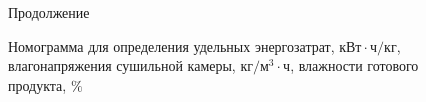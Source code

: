 \begin{figure} \ContinuedFloat
\center\addtocounter{figure}{1}
\begin{small}
\subfloat[\footnotesize 1~--~5,90; 2~--~6,59; 3~--~7,28; 4~--~7,97; 5~--~8,66;  6~--~9,34; 7~--~10,03; 8~--~10,72; 9~--~12,10]{%
\def\svgwidth{13cm}\label{f:sub5}}\quad
\end{small}
\begin{small}
\subfloat[\footnotesize 1~--~2,20; 2~--~2,43; 3~--~2,67; 4~--~2,90; 5~--~3,13;  6~--~3,37; 7~--~3,60; 8~--~3,83; 9~--~4,30]{%
\def\svgwidth{13cm}\label{f:sub6}}\quad
\end{small}
\caption{Продолжение}
\label{x1x3y1-y2}
\end{figure}



\begin{figure} 
\center
\begin{small}
\def\svgwidth{11.5cm}
\label{nomo2}
\end{small}
\caption{Номограмма для определения удельных энергозатрат,
$\text{кВт}\cdot\text{ч}/\text{кг}$,  влагонапряжения сушильной камеры, $\text{кг}/\text{м}^3\cdot\text{ч}$,  влажности готового продукта, $\%$}
\end{figure}